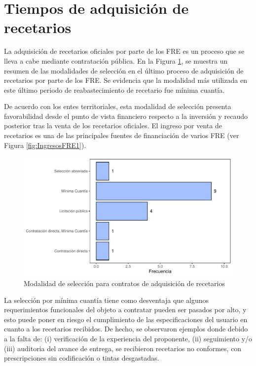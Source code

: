 \documentclass[
]{book}
\begin{document}
\hypertarget{tiempos-de-adquisiciuxf3n-de-recetarios}{%
\section{Tiempos de adquisición de recetarios}\label{tiempos-de-adquisiciuxf3n-de-recetarios}}


La adquisición de recetarios oficiales por parte de los FRE es un proceso que se lleva a cabe mediante contratación pública. En la Figura \ref{fig:modalidadAdquisicion}, se muestra un resumen de las modalidades de selección en el último proceso de adquisición de recetarios por parte de los FRE. Se evidencia que la modalidad más utilizada en este último periodo de reabastecimiento de recetario fue mínima cuantía.

De acuerdo con los entes territoriales, esta modalidad de selección presenta favorabilidad desde el punto de vista financiero respecto a la inversión y recaudo posterior tras la venta de los recetarios oficiales. El ingreso por venta de recetarios es una de las principales fuentes de financiación de varios FRE (ver Figura \ref{fig:IngresosFRE1}).

\begin{figure}
\includegraphics[width=0.85\linewidth]{InformeFinal_files/figure-latex/modalidadAdquisicion-1} \caption{Modalidad de selección para contratos de adquisición de recetarios}\label{fig:modalidadAdquisicion}
\end{figure}

La selección por mínima cuantía tiene como desventaja que algunos requerimientos funcionales del objeto a contratar pueden ser pasados por alto, y esto puede poner en riesgo el cumplimiento de las especificaciones del usuario en cuanto a los recetarios recibidos. De hecho, se observaron ejemplos donde debido a la falta de: (i) verificación de la experiencia del proponente, (ii) seguimiento y/o (iii) auditoria del avance de entrega, se recibieron recetarios no conformes, con prescripciones sin codificación o tintas desgastadas.
\end{document}
